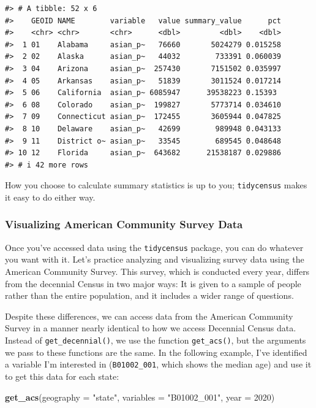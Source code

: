 \documentclass[
]{book}
\newenvironment{Shaded}{\begin{snugshade}}{\end{snugshade}}
\newcommand{\AttributeTok}[1]{\textcolor[rgb]{0.13,0.29,0.53}{#1}}
\newcommand{\DecValTok}[1]{\textcolor[rgb]{0.00,0.00,0.81}{#1}}
\newcommand{\FunctionTok}[1]{\textcolor[rgb]{0.13,0.29,0.53}{\textbf{#1}}}
\newcommand{\NormalTok}[1]{#1}
\newcommand{\StringTok}[1]{\textcolor[rgb]{0.31,0.60,0.02}{#1}}
\begin{document}
\begin{verbatim}
#> # A tibble: 52 x 6
#>    GEOID NAME        variable   value summary_value      pct
#>    <chr> <chr>       <chr>      <dbl>         <dbl>    <dbl>
#>  1 01    Alabama     asian_p~   76660       5024279 0.015258
#>  2 02    Alaska      asian_p~   44032        733391 0.060039
#>  3 04    Arizona     asian_p~  257430       7151502 0.035997
#>  4 05    Arkansas    asian_p~   51839       3011524 0.017214
#>  5 06    California  asian_p~ 6085947      39538223 0.15393 
#>  6 08    Colorado    asian_p~  199827       5773714 0.034610
#>  7 09    Connecticut asian_p~  172455       3605944 0.047825
#>  8 10    Delaware    asian_p~   42699        989948 0.043133
#>  9 11    District o~ asian_p~   33545        689545 0.048648
#> 10 12    Florida     asian_p~  643682      21538187 0.029886
#> # i 42 more rows
\end{verbatim}

How you choose to calculate summary statistics is up to you; \texttt{tidycensus} makes it easy to do either way.

\hypertarget{visualizing-american-community-survey-data}{%
\subsubsection*{Visualizing American Community Survey Data}\label{visualizing-american-community-survey-data}}

Once you've accessed data using the \texttt{tidycensus} package, you can do whatever you want with it. Let's practice analyzing and visualizing survey data using the American Community Survey. This survey, which is conducted every year, differs from the decennial Census in two major ways: It is given to a sample of people rather than the entire population, and it includes a wider range of questions.

Despite these differences, we can access data from the American Community Survey in a manner nearly identical to how we access Decennial Census data. Instead of \texttt{get\_decennial()}, we use the function \texttt{get\_acs()}, but the arguments we pass to these functions are the same. In the following example, I've identified a variable I'm interested in (\texttt{B01002\_001}, which shows the median age) and use it to get this data for each state:

\begin{Shaded}
\begin{Highlighting}[]
\FunctionTok{get\_acs}\NormalTok{(}\AttributeTok{geography =} \StringTok{"state"}\NormalTok{,}
        \AttributeTok{variables =} \StringTok{"B01002\_001"}\NormalTok{,}
        \AttributeTok{year =} \DecValTok{2020}\NormalTok{)}
\end{Highlighting}
\end{Shaded}
\end{document}
